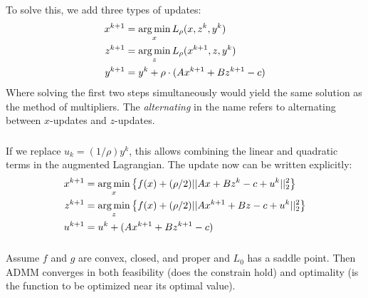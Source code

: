 \begin{frame}[fragile] \frametitle{}

To solve this, we add three types of updates:
\begin{align*}
x^{k+1} &= \mathop{\mathrm{arg\,min}}_x L_\rho (x, z^k, y^k) \\
z^{k+1} &= \mathop{\mathrm{arg\,min}}_z L_\rho (x^{k+1}, z, y^k) \\
y^{k+1} &= y^{k} + \rho \cdot (A x^{k+1} + B z^{k+1} - c)
\end{align*}
Where solving the first two steps simultaneously would yield the
same solution as the method of multipliers. The \textit{alternating}
in the name refers to alternating between $x$-updates and $z$-updates.

\end{frame}

\begin{frame}[fragile] \frametitle{}

If we replace $u_k = (1/\rho) y^k$, this allows combining the linear and
quadratic terms in the augmented Lagrangian. The update now can be written
explicitly:
\begin{align*}
x^{k+1} &= \mathop{\mathrm{arg\,min}}_x \left\{ f(x) + (\rho / 2) || A x + B z^{k} - c + u^k ||_2^2 \right\} \\
z^{k+1} &= \mathop{\mathrm{arg\,min}}_z \left\{ f(x) + (\rho / 2) || A x^{k+1} + B z - c + u^k ||_2^2 \right\} \\
u^{k+1} &= u^{k} + (A x^{k+1} + B z^{k+1} - c)
\end{align*}

\end{frame}

\begin{frame}[fragile] \frametitle{}

Assume $f$ and $g$ are convex, closed, and proper and $L_0$ has
a saddle point. Then ADMM converges in both feasibility (does the
constrain hold) and optimality (is the function to be optimized near
its optimal value).

\end{frame}

